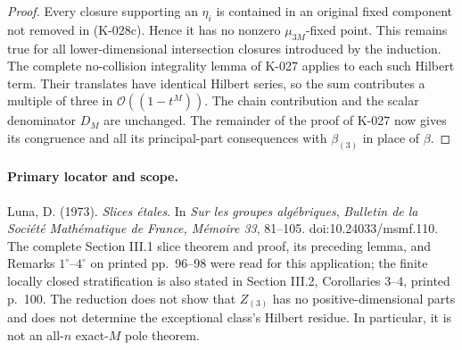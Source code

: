 \begin{proof}
Every closure supporting an $\eta_i$ is contained in an original
fixed component not removed in (K-028c).  Hence it has no nonzero
$\mu_{3M}$-fixed point.  This remains true for all lower-dimensional
intersection closures introduced by the induction.  The complete
no-collision integrality lemma of K-027 applies to each such
Hilbert term.  Their translates have identical Hilbert series,
so the sum contributes a multiple of three in
$\mathcal O((1-t^M))$.  The chain contribution and the scalar
denominator $D_M$ are unchanged.  The remainder of the proof
of K-027 now gives its congruence and all its principal-part
consequences with $\beta_{(3)}$ in place of $\beta$.
\end{proof}

\paragraph{Primary locator and scope.}
Luna, D. (1973). \emph{Slices \'etales}. In \emph{Sur les groupes
alg\'ebriques}, \emph{Bulletin de la Soci\'et\'e Math\'ematique de
France, M\'emoire 33}, 81--105. doi:10.24033/msmf.110.
The complete Section III.1 slice theorem and proof, its preceding
lemma, and Remarks $1^\circ$--$4^\circ$ on printed pp.~96--98 were
read for this application; the finite locally closed stratification
is also stated in Section III.2, Corollaries 3--4, printed p.~100.
The reduction does not show that $Z_{(3)}$ has no positive-dimensional
parts and does not determine the exceptional class's Hilbert residue.
In particular, it is not an all-$n$ exact-$M$ pole theorem.
